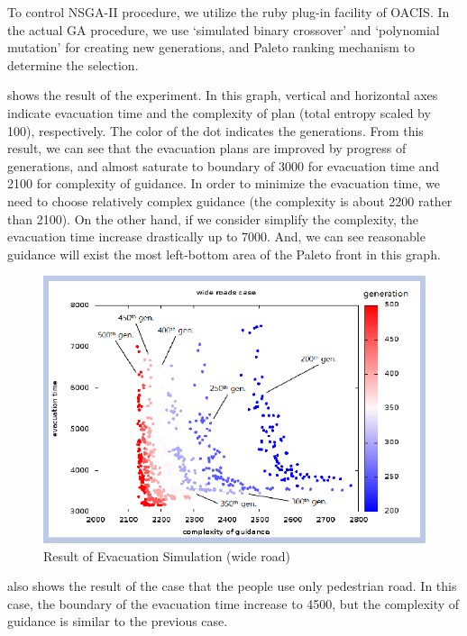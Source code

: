 To control NSGA-II procedure, we utilize the ruby plug-in facility of OACIS.
In the actual GA procedure, we use `simulated binary crossover' and
`polynomial mutation' for creating new generations,
and Paleto ranking mechanism to determine the selection.


 shows the result
of the experiment.
In this graph, vertical and horizontal axes indicate
evacuation time and the complexity of plan (total entropy
scaled by 100), respectively.
The color of the dot indicates the generations.
From this result,
we can see that the evacuation plans are improved by progress
of generations, and almost saturate to boundary of 3000 for
evacuation time and 2100 for complexity of guidance.
In order to minimize the evacuation time,
we need to choose relatively complex guidance (the complexity is about 2200
rather than 2100).
On the other hand, if we consider simplify the complexity,
the evacuation time increase drastically up to 7000.
And, we can see reasonable guidance will exist the most left-bottom
area of the Paleto front in this graph.

\begin{figure}
  \centering
  \includegraphics[width=.6\linewidth]{Figs.noda/figure-11.evac_wide.eps}
  \caption{Result of Evacuation Simulation (wide road)}
  \label{fig:Figs.noda/figure-11.evac_wide.eps}
\end{figure}

 also
shows the result of the case that the people use only pedestrian road.
In this case, the boundary of the evacuation time increase to 4500,
but the complexity of guidance is similar to the previous case.

